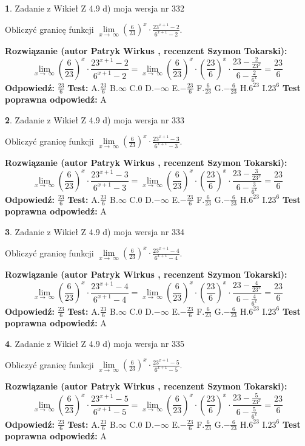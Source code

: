 \documentclass[12pt, a4paper]{article}
\theoremstyle{definition} %
\newtheorem{zad}{}
\newcommand{\zadStart}[1]{\begin{zad}#1\newline}
\newcommand{\zadStop}{\end{zad}}
\newcommand{\rozwStart}[2]{\noindent \textbf{Rozwiązanie (autor #1 , recenzent #2): }\newline}
\newcommand{\rozwStop}{\newline}
\newcommand{\odpStart}{\noindent \textbf{Odpowiedź:}\newline}
\newcommand{\odpStop}{\newline}
\newcommand{\testStart}{\noindent \textbf{Test:}\newline}
\newcommand{\testStop}{\newline}
\newcommand{\kluczStart}{\noindent \textbf{Test poprawna odpowiedź:}\newline}
\newcommand{\kluczStop}{\newline}
\begin{document}
\zadStart{Zadanie z Wikieł Z 4.9 d) moja wersja nr 332}


Obliczyć granicę funkcji  $\lim\limits_{x\to\ \infty}(\frac{6}{23})^{x}\cdot\frac{23^{x+1}-2}{6^{x+1}-2}$.
\zadStop
\rozwStart{Patryk Wirkus}{Szymon Tokarski}
$$\lim\limits_{x\to\ \infty}(\frac{6}{23})^{x}\cdot\frac{23^{x+1}-2}{6^{x+1}-2}=\lim\limits_{x\to\ \infty}(\frac{6}{23})^{x}\cdot(\frac{23}{6})^{x} \cdot \frac{23-\frac{2}{23^{x}}}{6-\frac{2}{6^{x}}} = \frac{23}{6}$$
\rozwStop
\odpStart
$\frac{23}{6}$
\odpStop
\testStart
A.$\frac{23}{6}$ B.$\infty$ C.$0$ D.$-\infty$ E.$-\frac{23}{6}$
F.$\frac{6}{23}$ G.$-\frac{6}{23}$
H.$6^{23}$
I.$23^{6}$
\testStop
\kluczStart
A
\kluczStop



\zadStart{Zadanie z Wikieł Z 4.9 d) moja wersja nr 333}


Obliczyć granicę funkcji  $\lim\limits_{x\to\ \infty}(\frac{6}{23})^{x}\cdot\frac{23^{x+1}-3}{6^{x+1}-3}$.
\zadStop
\rozwStart{Patryk Wirkus}{Szymon Tokarski}
$$\lim\limits_{x\to\ \infty}(\frac{6}{23})^{x}\cdot\frac{23^{x+1}-3}{6^{x+1}-3}=\lim\limits_{x\to\ \infty}(\frac{6}{23})^{x}\cdot(\frac{23}{6})^{x} \cdot \frac{23-\frac{3}{23^{x}}}{6-\frac{3}{6^{x}}} = \frac{23}{6}$$
\rozwStop
\odpStart
$\frac{23}{6}$
\odpStop
\testStart
A.$\frac{23}{6}$ B.$\infty$ C.$0$ D.$-\infty$ E.$-\frac{23}{6}$
F.$\frac{6}{23}$ G.$-\frac{6}{23}$
H.$6^{23}$
I.$23^{6}$
\testStop
\kluczStart
A
\kluczStop



\zadStart{Zadanie z Wikieł Z 4.9 d) moja wersja nr 334}


Obliczyć granicę funkcji  $\lim\limits_{x\to\ \infty}(\frac{6}{23})^{x}\cdot\frac{23^{x+1}-4}{6^{x+1}-4}$.
\zadStop
\rozwStart{Patryk Wirkus}{Szymon Tokarski}
$$\lim\limits_{x\to\ \infty}(\frac{6}{23})^{x}\cdot\frac{23^{x+1}-4}{6^{x+1}-4}=\lim\limits_{x\to\ \infty}(\frac{6}{23})^{x}\cdot(\frac{23}{6})^{x} \cdot \frac{23-\frac{4}{23^{x}}}{6-\frac{4}{6^{x}}} = \frac{23}{6}$$
\rozwStop
\odpStart
$\frac{23}{6}$
\odpStop
\testStart
A.$\frac{23}{6}$ B.$\infty$ C.$0$ D.$-\infty$ E.$-\frac{23}{6}$
F.$\frac{6}{23}$ G.$-\frac{6}{23}$
H.$6^{23}$
I.$23^{6}$
\testStop
\kluczStart
A
\kluczStop



\zadStart{Zadanie z Wikieł Z 4.9 d) moja wersja nr 335}


Obliczyć granicę funkcji  $\lim\limits_{x\to\ \infty}(\frac{6}{23})^{x}\cdot\frac{23^{x+1}-5}{6^{x+1}-5}$.
\zadStop
\rozwStart{Patryk Wirkus}{Szymon Tokarski}
$$\lim\limits_{x\to\ \infty}(\frac{6}{23})^{x}\cdot\frac{23^{x+1}-5}{6^{x+1}-5}=\lim\limits_{x\to\ \infty}(\frac{6}{23})^{x}\cdot(\frac{23}{6})^{x} \cdot \frac{23-\frac{5}{23^{x}}}{6-\frac{5}{6^{x}}} = \frac{23}{6}$$
\rozwStop
\odpStart
$\frac{23}{6}$
\odpStop
\testStart
A.$\frac{23}{6}$ B.$\infty$ C.$0$ D.$-\infty$ E.$-\frac{23}{6}$
F.$\frac{6}{23}$ G.$-\frac{6}{23}$
H.$6^{23}$
I.$23^{6}$
\testStop
\kluczStart
A
\kluczStop
\end{document}
